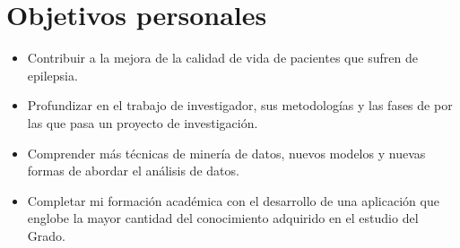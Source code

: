 \section{Objetivos personales}

\begin{itemize}
	\item Contribuir a la mejora de la calidad de vida de pacientes que sufren de epilepsia.
	\item Profundizar en el trabajo de investigador, sus metodologías y las fases de por las que pasa un proyecto de investigación.
	\item Comprender más técnicas de minería de datos, nuevos modelos y nuevas formas de abordar el análisis de datos.
	\item Completar mi formación académica con el desarrollo de una aplicación que englobe la mayor cantidad del conocimiento adquirido en el estudio del Grado.
\end{itemize}